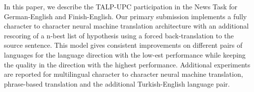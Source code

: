 In this paper, we describe the TALP-UPC participation in the News Task for German-English and Finish-English. Our primary submission implements a fully character to character neural machine translation architecture with an additional rescoring of a n-best list of hypothesis using a forced back-translation to the source sentence. This model gives consistent improvements on different pairs of languages for the language direction with the low-est performance while keeping the quality in the direction with the highest performance. Additional experiments are reported for multilingual character to character neural machine translation, phrase-based translation and the additional Turkish-English language pair.
